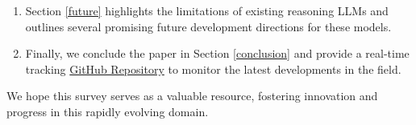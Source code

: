\begin{enumerate}[itemindent=0em]
\item Section \ref{future} highlights the limitations of existing reasoning LLMs and outlines several promising future development directions for these models.

\item Finally, we conclude the paper in Section \ref{conclusion} and provide a real-time tracking \href{https://github.com/zzli2022/Awesome-Slow-Reason-System}{{GitHub Repository}} to monitor the latest developments in the field. 

\end{enumerate}
We hope this survey serves as a valuable resource, fostering innovation and progress in this rapidly evolving domain.


















